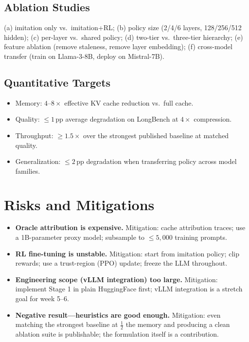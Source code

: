 \documentclass[journal]{IEEEtran}
\begin{document}
\subsection{Ablation Studies}
(a) imitation only vs.\ imitation+RL; (b) policy size (2/4/6 layers, 128/256/512 hidden); (c) per-layer vs.\ shared policy; (d) two-tier vs.\ three-tier hierarchy; (e) feature ablation (remove staleness, remove layer embedding); (f) cross-model transfer (train on Llama-3-8B, deploy on Mistral-7B).

\subsection{Quantitative Targets}
\begin{itemize}
    \item Memory: $4$--$8\times$ effective KV cache reduction vs.\ full cache.
    \item Quality: $\le 1$\,pp average degradation on LongBench at $4\times$ compression.
    \item Throughput: $\ge 1.5\times$ over the strongest published baseline at matched quality.
    \item Generalization: $\le 2$\,pp degradation when transferring policy across model families.
\end{itemize}

\section{Risks and Mitigations}
\begin{itemize}
    \item \textbf{Oracle attribution is expensive.} Mitigation: cache attribution traces; use a 1B-parameter proxy model; subsample to $\le 5{,}000$ training prompts.
    \item \textbf{RL fine-tuning is unstable.} Mitigation: start from imitation policy; clip rewards; use a trust-region (PPO) update; freeze the LLM throughout.
    \item \textbf{Engineering scope (vLLM integration) too large.} Mitigation: implement Stage 1 in plain HuggingFace first; vLLM integration is a stretch goal for week 5--6.
    \item \textbf{Negative result---heuristics are good enough.} Mitigation: even matching the strongest baseline at $\frac{1}{2}$ the memory and producing a clean ablation suite is publishable; the formulation itself is a contribution.
\end{itemize}
\end{document}

